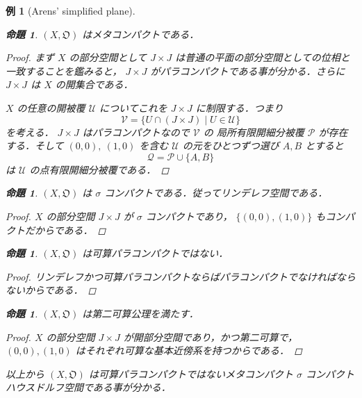 \documentclass[leqno, 12pt]{ltjsarticle}
\newtheorem{prop}[thm]{命題}
\newtheorem{exam}[thm]{例}
\begin{document}
\begin{exam}[Arens' simplified plane]
\begin{prop}
$(X,\mathfrak{O})$
はメタコンパクトである．
\end{prop}
\begin{proof}
まず
$X$
の部分空間として
$J\times J$
は普通の平面の部分空間としての位相と一致することを鑑みると，
$J\times J$
がパラコンパクトである事が分かる．さらに
$J\times J$
は
$X$
の開集合である．\par
$X$
の任意の開被覆
$\mathcal{U}$
についてこれを
$J\times J$
に制限する．つまり
\[
\mathcal{V}=\{U\cap (J\times J) \mid U\in \mathcal{U}\}
\]
を考える．
$J\times J$
はパラコンパクトなので
$\mathcal{V}$
の
局所有限開細分被覆
$\mathcal{P}$
が存在する．そして
$(0,0),\ (1,0)$
を含む
$\mathcal{U}$
の元をひとつずつ選び
$A,B$
とすると
\[
\mathcal{Q}=\mathcal{P}\cup \{A,B\}
\]は
$\mathcal{U}$
の点有限開細分被覆である．
\end{proof}



\begin{prop}
$(X,\mathfrak{O})$
は
$\sigma$
コンパクトである．従ってリンデレフ空間である．
\end{prop}
\begin{proof}
$X$
の部分空間
$J\times J$
が
$\sigma$
コンパクトであり，
$\{(0,0),(1,0)\}$
もコンパクトだからである．
\end{proof}



\begin{prop}
$(X,\mathfrak{O})$
は可算パラコンパクトではない．
\end{prop}
\begin{proof}
リンデレフかつ可算パラコンパクトならばパラコンパクトでなければならないからである．
\end{proof}


\begin{prop}
$(X,\mathfrak{O})$
は第二可算公理を満たす．
\end{prop}
\begin{proof}
$X$
の部分空間
$J\times J$
が開部分空間であり，かつ第二可算で，
$(0,0),(1,0)$
はそれぞれ可算な基本近傍系を持つからである．
\end{proof}



以上から
$(X,\mathfrak{O})$
は可算パラコンパクトではないメタコンパクト
$\sigma$
コンパクトハウスドルフ空間である事が分かる．

\end{exam}
\end{document}
